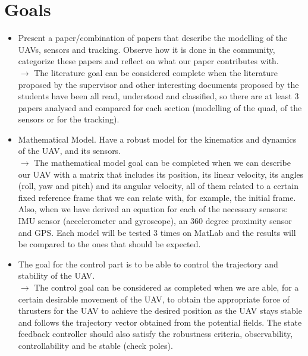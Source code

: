 \documentclass{article}
\begin{document}
	\section{Goals}	 
	\begin{itemize}
		\item Present a paper/combination of papers that describe the modelling of the UAVs, sensors and tracking. Observe how it is done in the community, categorize these papers and reflect on what our paper contributes with.\\  
		$\rightarrow$ The literature goal can be considered complete when the literature proposed by the supervisor and other interesting documents proposed by the students have been all read, understood and classified, so there are at least 3 papers analysed and compared for each section (modelling of the quad, of the sensors or for the tracking). %
	
		\item Mathematical Model. Have a robust model for the kinematics and dynamics of the UAV, and its sensors.\\
		$\rightarrow$ The mathematical model goal can be completed when we can describe our UAV with a matrix that includes its position, its linear velocity, its angles (roll, yaw and pitch) and its angular velocity, all of them related to a certain fixed reference frame that we can relate with, for example, the initial frame. Also, when we have derived an equation for each of the necessary sensors: IMU sensor (accelerometer and gyroscope), an 360 degree proximity sensor and GPS. Each model will be tested 3 times on MatLab and the results will be compared to the ones that should be expected.
		
		\item The goal for the control part is to be able to control the trajectory and stability of the UAV. \\
		$\rightarrow$ The control goal can be considered as completed when we are able, for a certain desirable movement of the UAV, to obtain the appropriate force of thrusters for the UAV to achieve the desired position as the UAV stays stable and follows the trajectory vector obtained from the potential fields. The state feedback controller should also satisfy the robustness criteria, observability, controllability and be stable (check poles).
		

\end{itemize}
\end{document}
